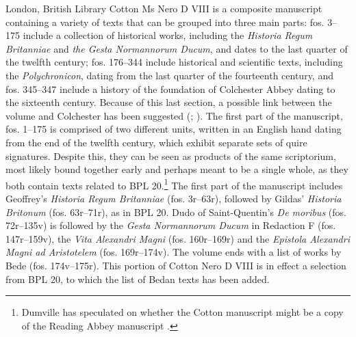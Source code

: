 \documentclass{article}
\begin{document}
London, British Library Cotton Ms Nero D VIII is a composite manuscript
containing a variety of texts that can be grouped into three main parts:
fos. 3--175 include a collection of historical works, including the
\emph{Historia Regum Britanniae} and \emph{the Gesta Normannorum Ducum},
and dates to the last quarter of the twelfth century; fos. 176--344
include historical and scientific texts, including the
\emph{Polychronicon}, dating from the last quarter of the fourteenth
century, and fos. 345--347 include a history of the foundation of
Colchester Abbey dating to the sixteenth century. Because of this last
section, a possible link between the volume and Colchester has been
suggested (\cite[xcvi]{van_houts_gesta_1992}; \cite[149--152]{crick_historia_1989}). The first part of
the manuscript, fos. 1--175 is comprised of two different units, written
in an English hand dating from the end of the twelfth century, which
exhibit separate sets of quire signatures. Despite this, they can be
seen as products of the same scriptorium, most likely bound together
early and perhaps meant to be a single whole, as they both contain texts
related to BPL 20.\footnote{Dumville has speculated on whether the
  Cotton manuscript might be a copy of the Reading Abbey manuscript 
  \citep[4]{dumville_early_1985}.} The first part of the manuscript includes
Geoffrey's \emph{Historia Regum Britanniae} (fos. 3r--63r), followed by
Gildas' \emph{Historia Britonum} (fos. 63r--71r), as in BPL 20. Dudo
of Saint-Quentin's \emph{De moribus} (fos. 72r--135v) is followed by the
\emph{Gesta Normannorum Ducum} in Redaction F (fos. 147r--159v), the
\emph{Vita Alexandri Magni} (fos. 160r--169r) and the \emph{Epistola
Alexandri Magni ad Aristotelem} (fos. 169r--174v). The volume ends with a
list of works by Bede (fos. 174v--175r). This portion of Cotton Nero D
VIII is in effect a selection from BPL 20, to which the list of Bedan
texts has been added.
\end{document}
